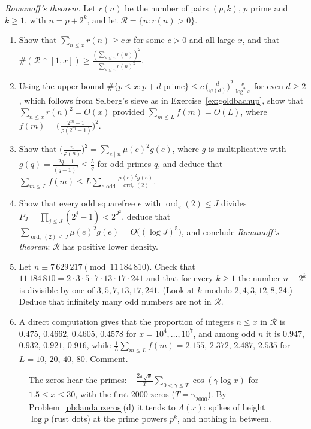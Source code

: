 \begin{exercise}[$\star\star\star$]\label{pb:romanoff}
\emph{Romanoff's theorem.} Let $r(n)$ be the number of pairs $(p,k)$, $p$ prime and $k\ge1$, with $n=p+2^k$, and let $\mathcal R=\{n:r(n)>0\}$.
\begin{enumerate}[label=(\alph*)]
\item Show that $\sum_{n\le x}r(n)\ge c\,x$ for some $c>0$ and all large $x$, and that $\#(\mathcal R\cap[1,x])\ge\frac{(\sum_{n\le x}r(n))^2}{\sum_{n\le x}r(n)^2}$.
\item Using the upper bound $\#\{p\le x:p+d\text{ prime}\}\le c\,\bigl(\frac d{\varphi(d)}\bigr)^2\frac x{\log^2x}$ for even $d\ge2$, which follows from Selberg's sieve as in
Exercise~\ref{ex:goldbachup}, show that $\sum_{n\le x}r(n)^2=O(x)$ provided $\sum_{m\le L}f(m)=O(L)$, where $f(m)=\bigl(\frac{2^m-1}{\varphi(2^m-1)}\bigr)^2$.
\item Show that $\bigl(\frac n{\varphi(n)}\bigr)^2=\sum_{e\mid n}\mu(e)^2g(e)$, where $g$ is multiplicative with $g(q)=\frac{2q-1}{(q-1)^2}\le\frac5q$ for odd primes $q$, and
deduce that $\sum_{m\le L}f(m)\le L\sum_{e\text{ odd}}\frac{\mu(e)^2g(e)}{\operatorname{ord}_e(2)}$.
\item Show that every odd squarefree $e$ with $\operatorname{ord}_e(2)\le J$ divides $P_J=\prod_{j\le J}(2^j-1)<2^{J^2}$, deduce that
$\sum_{\operatorname{ord}_e(2)\le J}\mu(e)^2g(e)=O\bigl((\log J)^5\bigr)$, and conclude \emph{Romanoff's theorem}: $\mathcal R$ has positive lower density.
\item Let $n\equiv7\,629\,217\pmod{11\,184\,810}$. Check that $11\,184\,810=2\cdot3\cdot5\cdot7\cdot13\cdot17\cdot241$ and that for every $k\ge1$ the number $n-2^k$ is
divisible by one of $3,5,7,13,17,241$. (Look at $k$ modulo $2,4,3,12,8,24$.) Deduce that infinitely many odd numbers are not in $\mathcal R$.
\item A direct computation gives that the proportion of integers $n\le x$ in $\mathcal R$ is $0.475$, $0.4662$, $0.4605$, $0.4578$ for $x=10^4,\dots,10^7$, and among odd $n$
it is $0.947$, $0.932$, $0.921$, $0.916$, while $\frac1L\sum_{m\le L}f(m)=2.155$, $2.372$, $2.487$, $2.535$ for $L=10$, $20$, $40$, $80$. Comment.
\end{enumerate}
\end{exercise}

\begin{figure}[ht]
\centering
{}
\caption{The zeros hear the primes: $-\frac{2\pi\sqrt x}T\sum_{0<\gamma\le T}\cos(\gamma\log x)$ for $1.5\le x\le30$, with the first $2000$ zeros
($T=\gamma_{2000}$). By Problem~\ref{pb:landauzeros}(d) it tends to $\Lambda(x)$: spikes of height $\log p$ (rust dots) at the prime powers $p^k$, and nothing in
between.}\label{fig:landau}
\end{figure}

